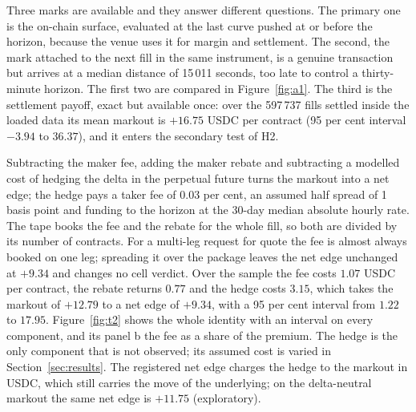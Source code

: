 \documentclass[a4paper,fleqn]{cas-dc}
\begin{document}
Three marks are available and they answer different questions. The primary one is the on-chain surface,
evaluated at the last curve pushed at or before the horizon, because the venue uses it
for margin and settlement. The second, the mark attached to the next fill in the same instrument, is
a genuine transaction but arrives at a median distance of 15\,011 seconds, too late to control a
thirty-minute horizon. The first two are compared in Figure~\ref{fig:a1}. The third is the settlement payoff,
exact but available once: over the 597\,737 fills settled inside the loaded data its mean markout is
$+16.75$ USDC per contract (95 per cent interval $-3.94$ to $36.37$), and it enters the secondary test of H2.

Subtracting the maker fee, adding the maker rebate and subtracting a modelled cost of hedging the
delta in the perpetual future turns the markout into a net edge; the hedge pays a taker fee of 0.03 per cent, an
assumed half spread of 1 basis point and funding to the horizon at the 30-day median absolute hourly rate. The tape books the fee and the rebate for the whole
fill, so both are divided by its number of contracts. For a multi-leg request for quote
the fee is almost always booked on one leg; spreading it over the package leaves the net edge unchanged at $+9.34$ and changes no cell
verdict. Over the sample the fee costs $1.07$
USDC per contract, the rebate returns $0.77$ and the hedge costs $3.15$, which takes the markout of $+12.79$
to a net edge of $+9.34$, with a 95 per cent interval from $1.22$ to $17.95$. Figure~\ref{fig:t2} shows the
whole identity with an interval on every component, and its panel b the fee as a share of the premium. The hedge is the only component that is not observed;
its assumed cost is varied in Section~\ref{sec:results}. The registered net
edge charges the hedge to the markout in USDC, which still carries the move of the underlying; on the
delta-neutral markout the same net edge is $+11.75$ (exploratory).
\end{document}
